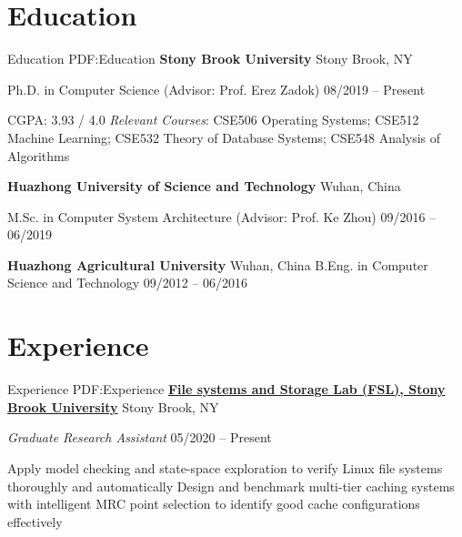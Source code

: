 \documentclass[letterpaper,10pt,oneside]{article}
\begin{document}
\begin{body}


\section
{Education}
{Education}
{PDF:Education}
{\textbf{Stony Brook University}}
\hfill
Stony Brook, NY

\BulletItem
Ph.D. in
{Computer Science} (Advisor: Prof. Erez Zadok)
\hfill
08/2019 -- Present
\begin{detail}
\BulletItem
CGPA: 3.93 / 4.0 
\BulletItem
\emph{Relevant Courses}: CSE506 Operating Systems; 
CSE512  Machine Learning; CSE532 Theory of Database Systems; CSE548 Analysis of Algorithms

\end{detail}

\BigGap

{\textbf{Huazhong University of Science and Technology}}
\hfill
Wuhan, China

\GapNoBreak
\BulletItem
M.Sc. in
{Computer System Architecture} (Advisor: Prof. Ke Zhou)
\hfill
09/2016 -- 06/2019
\begin{detail}
\end{detail}

\BigGap
{\textbf{Huazhong Agricultural University}}
\hfill
Wuhan, China
\GapNoBreak
\BulletItem
B.Eng. in
{Computer Science and Technology}
\hfill
09/2012 -- 06/2016
\begin{detail}
\end{detail}

\section
{Experience}
{Experience}
{PDF:Experience}
\href{https://www.fsl.cs.stonybrook.edu/}
{{\textbf{File systems and Storage Lab (FSL), Stony Brook University}}}
\hfill
Stony Brook, NY

\emph{Graduate Research Assistant}
\hfill
05/2020 --
Present

\GapNoBreak
\BulletItem
Apply model checking and state-space exploration to verify Linux file systems thoroughly and automatically
\GapNoBreak
\BulletItem
Design and benchmark multi-tier caching systems with intelligent MRC point selection to identify good cache configurations effectively


\end{body}
\end{document}
